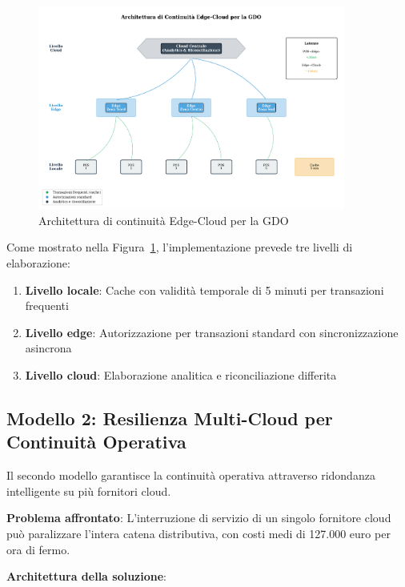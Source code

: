 \begin{figure}[htbp]
\centering
\includegraphics[width=0.9\textwidth]{thesis_figures/cap4/fig_3_1_edge_cloud_architecture.pdf}
\caption{Architettura di continuità Edge-Cloud per la GDO}
\label{fig:edge-cloud}
\end{figure}

Come mostrato nella Figura~\ref{fig:edge-cloud}, l'implementazione prevede tre livelli di elaborazione:
\begin{enumerate}
    \item \textbf{Livello locale}: Cache con validità temporale di 5 minuti per transazioni frequenti
    \item \textbf{Livello edge}: Autorizzazione per transazioni standard con sincronizzazione asincrona  
    \item \textbf{Livello cloud}: Elaborazione analitica e riconciliazione differita
\end{enumerate}

\subsection{Modello 2: Resilienza Multi-Cloud per Continuità Operativa}
\label{subsec:multi-cloud}

Il secondo modello garantisce la continuità operativa attraverso ridondanza intelligente su più fornitori cloud.

\textbf{Problema affrontato}: L'interruzione di servizio di un singolo fornitore cloud può paralizzare l'intera catena distributiva, con costi medi di 127.000 euro per ora di fermo\autocite{Uptime2024}.

\textbf{Architettura della soluzione}:


